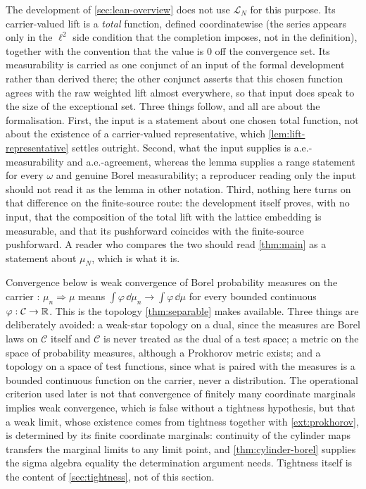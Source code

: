\begin{remark}\label{rem:lift-development}
The development of \cref{sec:lean-overview} does not use $\mathcal L_N$ for this
purpose. Its carrier-valued lift is a \emph{total} function, defined
coordinatewise (the series appears only in the $\ell^2$ side condition that the
completion imposes, not in the definition), together with the convention that the
value is $0$ off the convergence set. Its measurability is carried as one
conjunct of an input of the formal development rather than derived there; the
other conjunct asserts that this chosen function agrees with the raw weighted
lift almost everywhere, so that input does speak to the size of the exceptional
set. Three things follow, and all are about the formalisation.
First, the input is a statement about one chosen total function, not about the
existence of a carrier-valued representative, which
\cref{lem:lift-representative} settles outright.
Second, what the input supplies is a.e.-measurability and a.e.-agreement,
whereas the lemma supplies a range statement for every $\omega$ and genuine
Borel measurability; a reproducer reading only the input should not read it as
the lemma in other notation.
Third, nothing here turns on that difference on the finite-source route: the
development itself proves, with no input, that the composition of the total lift
with the lattice embedding is measurable, and that its pushforward coincides
with the finite-source pushforward. A reader who compares the two should read
\cref{thm:main} as a statement about $\mu_N$, which is what it is.
\end{remark}


\begin{remark}\label{rem:topology}
Convergence below is weak convergence of Borel probability measures on the
carrier \cite{billingsley1999}: $\mu_n\Rightarrow\mu$ means
$\int\varphi\,\dd\mu_n\to\int\varphi\,\dd\mu$ for every bounded continuous
$\varphi:\mathcal C\to\mathbb{R}$. This is the topology \cref{thm:separable} makes
available. Three things are deliberately avoided: a weak-star topology on a dual,
since the measures are Borel laws on $\mathcal C$ itself and $\mathcal C$ is
never treated as the dual of a test space; a metric on the space of probability
measures, although a Prokhorov metric exists; and a topology on a space of test
functions, since what is paired with the measures is a bounded continuous
function on the carrier, never a distribution. The operational criterion used
later is not that convergence of finitely many coordinate marginals implies weak
convergence, which is false without a tightness hypothesis, but that a weak
limit, whose existence comes from tightness together with \cref{ext:prokhorov},
is determined by its finite coordinate marginals: continuity of the cylinder maps
transfers the marginal limits to any limit point, and \cref{thm:cylinder-borel}
supplies the sigma algebra equality the determination argument needs. Tightness
itself is the content of \cref{sec:tightness}, not of this section.
\end{remark}
